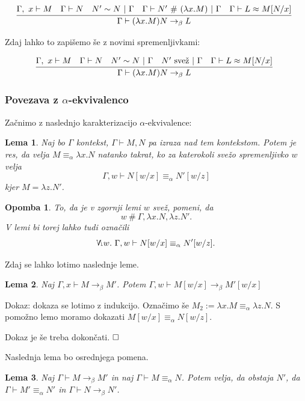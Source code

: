 \documentclass{article}
\newcommand{\inference}[3][]{\infer[#1]{#3}{#2}}
\def\qed{$\hfill\Box$}   %
\newtheorem{lema}{Lema}
\newtheorem{opomba}{Opomba}
\begin{document}
\[
    \inference{\Gamma,\ x \vdash M \quad \Gamma \vdash N \quad N' \sim N \ \vert\ \Gamma \quad \Gamma \vdash N'\ \#\ (\lambda x. M) \ \vert\ \Gamma \quad \Gamma \vdash L \approx M[N/x]}{\Gamma \vdash (\lambda x.M)N \rightarrow_\beta L}
\]

Zdaj lahko to zapišemo še z novimi spremenljivkami:

\[
    \inference{\Gamma,\ x \vdash M \quad \Gamma \vdash N \quad N' \sim N \ \vert\ \Gamma \quad N'\ \text{svež}\ \vert\ \Gamma \quad \Gamma \vdash L \approx M[N/x]}{\Gamma \vdash (\lambda x.M)N \rightarrow_\beta L}
\]


\subsubsection{Povezava z \(\alpha\)-ekvivalenco}

Začnimo z naslednjo karakterizacijo \(\alpha\)-ekvivalence:

\begin{lema}
    Naj bo \(\Gamma\) kontekst, \(\Gamma \vdash M, N\) pa izraza nad tem kontekstom. Potem je res, da velja \(M \equiv_\alpha \lambda x.N\) natanko takrat, ko za katerokoli svežo spremenljivko \(w\) velja \[
        \Gamma, w \vdash N[w/x] \equiv_\alpha N'[w/z]
    \]
    kjer \(M = \lambda z. N'\).
\end{lema}

\begin{opomba}
    To, da je v zgornji lemi \(w\) svež, pomeni, da \[
        w\ \#\ \Gamma, \lambda x. N, \lambda z. N'.
    \]
    V lemi bi torej lahko tudi označili
    \[
        \reflectbox{\(\mathsf{\emph{N}}\)}w.\ \Gamma, w \vdash N[w/x] \equiv_\alpha N'[w/z].
    \]
\end{opomba}

Zdaj se lahko lotimo naslednje leme.

\begin{lema}
    Naj \(\Gamma, x \vdash M \rightarrow_\beta M'\). Potem \(\Gamma, w \vdash M[w/x] \rightarrow_\beta M'[w/x]\)
\end{lema}

Dokaz:
dokaza se lotimo z indukcijo.
Označimo še \(M_2 := \lambda x.M \equiv_\alpha \lambda z. N\).
S pomožno lemo moramo dokazati \(M[w/x] \equiv_\alpha N[w/z]\).

Dokaz je še treba dokončati.
\qed


Naslednja lema bo osrednjega pomena.

\begin{lema}
    Naj \(\Gamma \vdash M \rightarrow_\beta M'\) in naj
    \(\Gamma \vdash M \equiv_\alpha N\).
    Potem velja, da obstaja \(N'\), da \(\Gamma \vdash M' \equiv_\alpha N' \) in \(\Gamma \vdash N \rightarrow_\beta N'\).
\end{lema}
\end{document}
